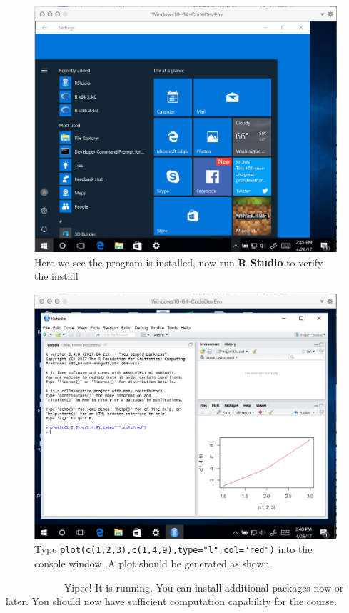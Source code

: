 \begin{figure}[h!] %
   \centering
   \includegraphics[width=4.5in]{./1-Introduction/verifyInstall.jpg} 
   \caption{Here we see the program is installed, now run \textbf{R Studio} to verify the install}
\end{figure}

\begin{figure}[h!] %
   \centering
   \includegraphics[width=4.5in]{./1-Introduction/verifyInstall2.jpg} 
   \caption{Type \texttt{plot(c(1,2,3),c(1,4,9),type="l",col="red")} into the console window.  A plot should be generated as shown}
\end{figure}

\newpage~
\newpage~
\newpage~
\newpage~
\newpage~
\newpage~
\newpage~
Yipee!  It is running.  You can install additional packages now or later.  You should now have sufficient computation capability for the course.  
\clearpage

